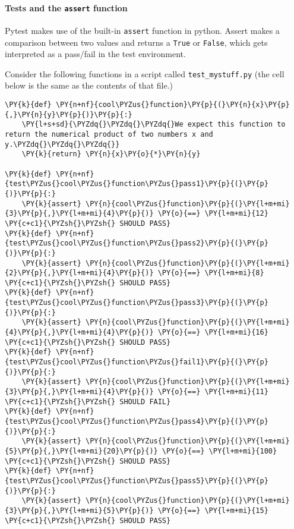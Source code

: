     \hypertarget{tests-and-the-assert-function}{%
\paragraph{\texorpdfstring{Tests and the \texttt{assert}
function}{Tests and the assert function}}\label{tests-and-the-assert-function}}

Pytest makes use of the built-in \texttt{assert} function in python.
Assert makes a comparison between two values and returns a \texttt{True}
or \texttt{False}, which gets interpreted as a pass/fail in the test
environment.

Consider the following functions in a script called
\texttt{test\_mystuff.py} (the cell below is the same as the contents of
that file.)

    \begin{tcolorbox}[breakable, size=fbox, boxrule=1pt, pad at break*=1mm,colback=cellbackground, colframe=cellborder]
\begin{Verbatim}[commandchars=\\\{\}]
\PY{k}{def} \PY{n+nf}{cool\PYZus{}function}\PY{p}{(}\PY{n}{x}\PY{p}{,}\PY{n}{y}\PY{p}{)}\PY{p}{:}
    \PY{l+s+sd}{\PYZdq{}\PYZdq{}\PYZdq{}We expect this function to return the numerical product of two numbers x and y.\PYZdq{}\PYZdq{}\PYZdq{}}
    \PY{k}{return} \PY{n}{x}\PY{o}{*}\PY{n}{y}

\PY{k}{def} \PY{n+nf}{test\PYZus{}cool\PYZus{}function\PYZus{}pass1}\PY{p}{(}\PY{p}{)}\PY{p}{:}
    \PY{k}{assert} \PY{n}{cool\PYZus{}function}\PY{p}{(}\PY{l+m+mi}{3}\PY{p}{,}\PY{l+m+mi}{4}\PY{p}{)} \PY{o}{==} \PY{l+m+mi}{12}  \PY{c+c1}{\PYZsh{}\PYZsh{} SHOULD PASS}
\PY{k}{def} \PY{n+nf}{test\PYZus{}cool\PYZus{}function\PYZus{}pass2}\PY{p}{(}\PY{p}{)}\PY{p}{:}
    \PY{k}{assert} \PY{n}{cool\PYZus{}function}\PY{p}{(}\PY{l+m+mi}{2}\PY{p}{,}\PY{l+m+mi}{4}\PY{p}{)} \PY{o}{==} \PY{l+m+mi}{8}  \PY{c+c1}{\PYZsh{}\PYZsh{} SHOULD PASS}
\PY{k}{def} \PY{n+nf}{test\PYZus{}cool\PYZus{}function\PYZus{}pass3}\PY{p}{(}\PY{p}{)}\PY{p}{:}
    \PY{k}{assert} \PY{n}{cool\PYZus{}function}\PY{p}{(}\PY{l+m+mi}{4}\PY{p}{,}\PY{l+m+mi}{4}\PY{p}{)} \PY{o}{==} \PY{l+m+mi}{16}  \PY{c+c1}{\PYZsh{}\PYZsh{} SHOULD PASS}
\PY{k}{def} \PY{n+nf}{test\PYZus{}cool\PYZus{}function\PYZus{}fail1}\PY{p}{(}\PY{p}{)}\PY{p}{:}
    \PY{k}{assert} \PY{n}{cool\PYZus{}function}\PY{p}{(}\PY{l+m+mi}{3}\PY{p}{,}\PY{l+m+mi}{4}\PY{p}{)} \PY{o}{==} \PY{l+m+mi}{11}  \PY{c+c1}{\PYZsh{}\PYZsh{} SHOULD FAIL}
\PY{k}{def} \PY{n+nf}{test\PYZus{}cool\PYZus{}function\PYZus{}pass4}\PY{p}{(}\PY{p}{)}\PY{p}{:}
    \PY{k}{assert} \PY{n}{cool\PYZus{}function}\PY{p}{(}\PY{l+m+mi}{5}\PY{p}{,}\PY{l+m+mi}{20}\PY{p}{)} \PY{o}{==} \PY{l+m+mi}{100}  \PY{c+c1}{\PYZsh{}\PYZsh{} SHOULD PASS}
\PY{k}{def} \PY{n+nf}{test\PYZus{}cool\PYZus{}function\PYZus{}pass5}\PY{p}{(}\PY{p}{)}\PY{p}{:}
    \PY{k}{assert} \PY{n}{cool\PYZus{}function}\PY{p}{(}\PY{l+m+mi}{3}\PY{p}{,}\PY{l+m+mi}{5}\PY{p}{)} \PY{o}{==} \PY{l+m+mi}{15}  \PY{c+c1}{\PYZsh{}\PYZsh{} SHOULD PASS}
\end{Verbatim}
\end{tcolorbox}

